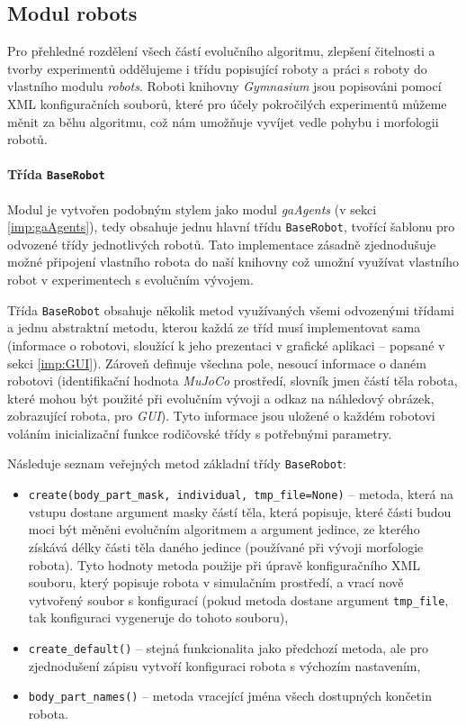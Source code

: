 \subsection{Modul robots} \label{imp:robots}
Pro přehledné rozdělení všech částí evolučního algoritmu, zlepšení čitelnosti a
tvorby experimentů oddělujeme i třídu popisující roboty a práci s roboty do
vlastního modulu \emph{robots}. Roboti knihovny \emph{Gymnasium} jsou
popisováni pomocí XML konfiguračních souborů, které pro účely pokročilých
experimentů můžeme měnit za běhu algoritmu, což nám umožňuje vyvíjet vedle
pohybu i morfologii robotů. 

\paragraph{Třída \texttt{BaseRobot}}
Modul je vytvořen podobným stylem jako modul \emph{gaAgents} (v sekci
\ref{imp:gaAgents}), tedy obsahuje jednu hlavní třídu \texttt{BaseRobot},
tvořící šablonu pro odvozené třídy jednotlivých robotů. Tato implementace
zásadně zjednodušuje možné připojení vlastního robota do naší knihovny což
umožní využívat vlastního robot v experimentech s evolučním vývojem. 

Třída \texttt{BaseRobot} obsahuje několik metod využívaných všemi odvozenými
třídami a jednu abstraktní metodu, kterou každá ze tříd musí implementovat sama
(informace o robotovi, sloužící k jeho prezentaci v grafické aplikaci --
popsané v sekci \ref{imp:GUI}). Zároveň definuje všechna pole, nesoucí
informace o daném robotovi (identifikační hodnota \emph{MuJoCo} prostředí,
slovník jmen částí těla robota, které mohou být použité při evolučním vývoji a
odkaz na náhledový obrázek, zobrazující robota, pro \emph{GUI}). Tyto informace
jsou uložené o každém robotovi voláním inicializační funkce rodičovské třídy s
potřebnými parametry.

Následuje seznam veřejných metod základní třídy
\texttt{BaseRobot}:

\begin{itemize}
    \item \texttt{create(body\_part\_mask, individual, tmp\_file=None)}
        -- metoda, která na vstupu dostane argument masky částí těla, která
        popisuje, které části budou moci být měněni evolučním algoritmem a
        argument jedince, ze kterého získává délky části těla daného jedince
        (používané při vývoji morfologie robota). Tyto hodnoty metoda použije
        při úpravě konfiguračního XML souboru, který popisuje robota v
        simulačním prostředí, a vrací nově vytvořený soubor s konfigurací
        (pokud metoda dostane argument \texttt{tmp\_file}, tak konfiguraci
        vygeneruje do tohoto souboru),
    \item \texttt{create\_default()} -- stejná funkcionalita jako předchozí
        metoda, ale pro zjednodušení zápisu vytvoří konfiguraci robota s
        výchozím nastavením,
    \item \texttt{body\_part\_names()} -- metoda vracející jména všech
        dostupných končetin robota.
\end{itemize}

